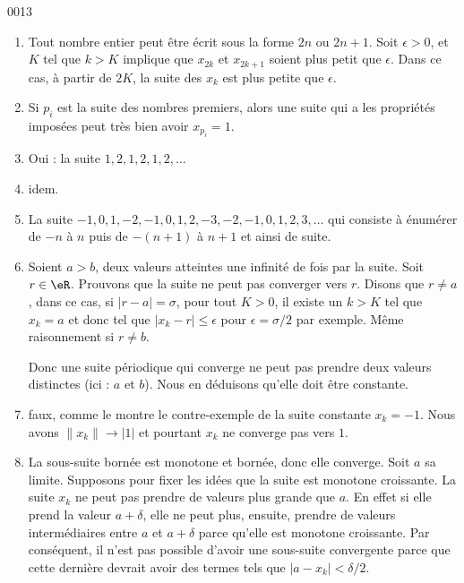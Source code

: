 
\begin{corrige}{0013}

\begin{enumerate}
\item Tout nombre entier peut être écrit sous la forme $2n$ ou $2n+1$. Soit $\epsilon>0$, et $K$ tel que $k>K$ implique que $x_{2k}$ et $x_{2k+1}$ soient plus petit que $\epsilon$. Dans ce cas, à partir de $2K$, la suite des $x_k$ est plus petite que $\epsilon$.
\item Si $p_i$ est la suite des nombres premiers, alors une suite qui a les propriétés imposées peut très bien avoir $x_{p_i}=1$.
\item Oui : la suite $1,2,1,2,1,2,\ldots$
\item idem.
\item La suite $-1,0,1,-2,-1,0,1,2,-3,-2,-1,0,1,2,3,\ldots$ qui consiste à énumérer de $-n$ à $n$ puis de $-(n+1)$ à $n+1$ et ainsi de suite.
\item Soient $a>b$, deux valeurs atteintes une infinité de fois par la suite. Soit $r\in\eR$. Prouvons que la suite ne peut pas converger vers $r$. Disons que $r\neq a$, dans ce cas, si $| r-a |=\sigma$, pour tout $K>0$, il existe un $k>K$ tel que $x_k=a$ et donc tel que $| x_k-r |\leq\epsilon$ pour $\epsilon=\sigma/2$ par exemple. Même raisonnement si $r\neq b$.

Donc une suite périodique qui converge ne peut pas prendre deux valeurs distinctes (ici : $a$ et $b$). Nous en déduisons qu'elle doit être constante.

\item faux, comme le montre le contre-exemple de la suite constante $x_k=-1$. Nous avons $\| x_k \|\to| 1 |$ et pourtant $x_k$ ne converge pas vers $1$.

\item La sous-suite bornée est monotone et bornée, donc elle converge. Soit $a$ sa limite. Supposons pour fixer les idées que la suite est monotone croissante. La suite $x_k$ ne peut pas prendre de valeurs plus grande que $a$. En effet si elle prend la valeur $a+\delta$, elle ne peut plus, ensuite, prendre de valeurs intermédiaires entre $a$ et $a+\delta$ parce qu'elle est monotone croissante. Par conséquent, il n'est pas possible d'avoir une sous-suite convergente parce que cette dernière devrait avoir des termes tels que $| a-x_k |<\delta/2$.


\end{enumerate}
\end{corrige}

